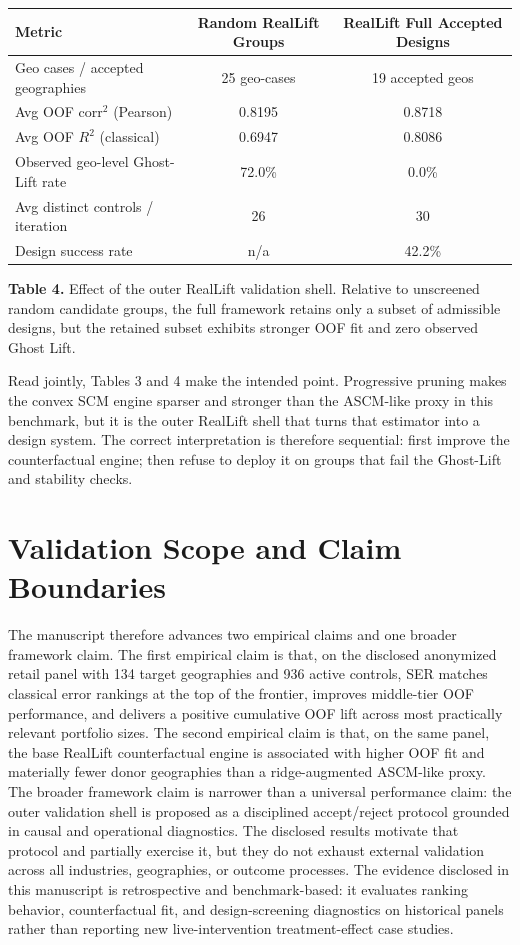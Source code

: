 \documentclass[11pt]{article}
\begin{document}
\begin{center}
\small
\begin{tabular}{lcc}
\hline
Metric & Random RealLift Groups & RealLift Full Accepted Designs \\
\hline
Geo cases / accepted geographies & 25 geo-cases & 19 accepted geos \\
Avg OOF corr$^2$ (Pearson) & 0.8195 & 0.8718 \\
Avg OOF $R^2$ (classical) & 0.6947 & 0.8086 \\
Observed geo-level Ghost-Lift rate & 72.0\% & 0.0\% \\
Avg distinct controls / iteration & 26 & 30 \\
Design success rate & n/a & 42.2\% \\
\hline
\end{tabular}
\end{center}

\noindent\textbf{Table 4.} Effect of the outer RealLift validation shell. Relative to unscreened random candidate groups, the full framework retains only a subset of admissible designs, but the retained subset exhibits stronger OOF fit and zero observed Ghost Lift.

Read jointly, Tables 3 and 4 make the intended point. Progressive pruning makes the convex SCM engine sparser and stronger than the ASCM-like proxy in this benchmark, but it is the outer RealLift shell that turns that estimator into a design system. The correct interpretation is therefore sequential: first improve the counterfactual engine; then refuse to deploy it on groups that fail the Ghost-Lift and stability checks.

\section{Validation Scope and Claim Boundaries}
The manuscript therefore advances two empirical claims and one broader framework claim. The first empirical claim is that, on the disclosed anonymized retail panel with 134 target geographies and 936 active controls, SER matches classical error rankings at the top of the frontier, improves middle-tier OOF performance, and delivers a positive cumulative OOF lift across most practically relevant portfolio sizes. The second empirical claim is that, on the same panel, the base RealLift counterfactual engine is associated with higher OOF fit and materially fewer donor geographies than a ridge-augmented ASCM-like proxy. The broader framework claim is narrower than a universal performance claim: the outer validation shell is proposed as a disciplined accept/reject protocol grounded in causal and operational diagnostics. The disclosed results motivate that protocol and partially exercise it, but they do not exhaust external validation across all industries, geographies, or outcome processes. The evidence disclosed in this manuscript is retrospective and benchmark-based: it evaluates ranking behavior, counterfactual fit, and design-screening diagnostics on historical panels rather than reporting new live-intervention treatment-effect case studies.
\end{document}
